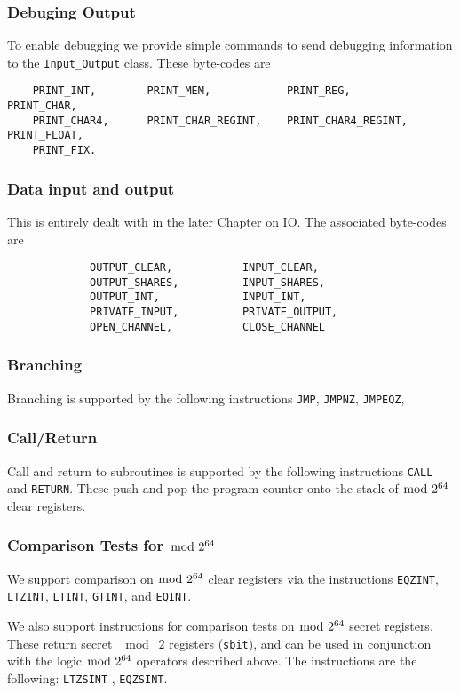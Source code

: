 \subsubsection{Debuging Output}
To enable debugging we provide simple commands to send
debugging information to the \verb+Input_Output+ class.
These byte-codes are
\begin{verbatim}
    PRINT_INT,        PRINT_MEM,            PRINT_REG,              PRINT_CHAR,
    PRINT_CHAR4,      PRINT_CHAR_REGINT,    PRINT_CHAR4_REGINT,     PRINT_FLOAT,
    PRINT_FIX.
\end{verbatim}

\subsubsection{Data input and output}
This is entirely dealt with in the later Chapter on IO.
The associated byte-codes are
\begin{verbatim}
             OUTPUT_CLEAR,           INPUT_CLEAR,
             OUTPUT_SHARES,          INPUT_SHARES,
             OUTPUT_INT,             INPUT_INT,
             PRIVATE_INPUT,          PRIVATE_OUTPUT,
             OPEN_CHANNEL,           CLOSE_CHANNEL
\end{verbatim}

\subsubsection{Branching}
Branching is supported by the following instructions
 \verb+JMP+,
    \verb+JMPNZ+,
    \verb+JMPEQZ+,

\subsubsection{Call/Return}
Call and return to subroutines is supported by the following
instructions
\verb+CALL+ and \verb+RETURN+.
These push and pop the program counter onto the stack of
$\bmod \; 2^{64}$ clear registers.

\subsubsection{Comparison Tests for $\bmod \; 2^{64}$}
We support comparison on $\bmod \; 2^{64}$ clear registers via the instructions
\verb+EQZINT+, \verb+LTZINT+, \verb+LTINT+, \verb+GTINT+, and \verb+EQINT+.

We also support instructions for comparison tests on $\bmod \; 2^{64}$ secret registers. These return
secret $\mod \; 2$ registers (\verb+sbit+), and can be used in conjunction with the logic $\bmod \; 2^{64}$ operators described above. The instructions are the following:
\verb+LTZSINT+ ,
\verb+EQZSINT+.

